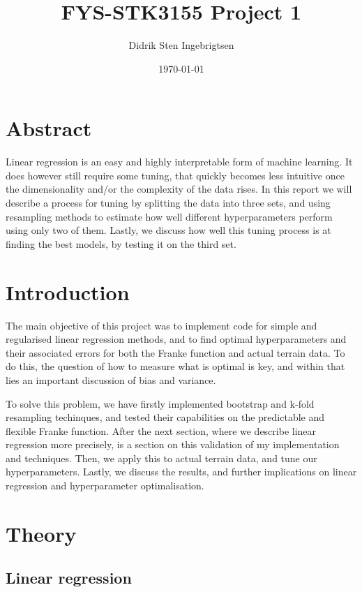 \documentclass[11pt, a4paper]{report}
\title{FYS-STK3155 Project 1}
\author{Didrik Sten Ingebrigtsen}
\date{\today}
\begin{document}
\maketitle

\chapter{Abstract}

Linear regression is an easy and highly interpretable form of machine learning. It does however still require some tuning, that quickly becomes less intuitive once the dimensionality and/or the complexity of the data rises. In this report we will describe a process for tuning by splitting the data into three sets, and using resampling methods to estimate how well different hyperparameters perform using only two of them. Lastly, we discuss how well this tuning process is at finding the best models, by testing it on the third set.

\chapter{Introduction}

The main objective of this project was to implement code for simple and regularised linear regression methods, and to find optimal hyperparameters and their associated errors for both the Franke function and actual terrain data. To do this, the question of how to measure what is optimal is key, and within that lies an important discussion of bias and variance.

To solve this problem, we have firstly implemented bootstrap and k-fold resampling techinques, and tested their capabilities on the predictable and flexible Franke function. After the next section, where we describe linear regression more precisely, is a section on this validation of my implementation and techniques. Then, we apply this to actual terrain data, and tune our hyperparameters. Lastly, we discuss the results, and further implications on linear regression and hyperparameter optimalisation.

\chapter{Theory}

\section{Linear regression}
\end{document}
